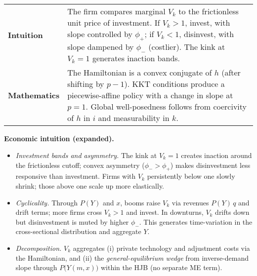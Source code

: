 ﻿\documentclass[11pt,letterpaper,oneside]{article}
\numberwithin{equation}{section}
\newcommand{\1}{\mathbf{1}}
\begin{document}
\begin{tcolorbox}[didacticstyle]
\sloppy
\begin{tabularx}{\textwidth}{@{}p{}X@{}}
\textbf{Intuition} & The firm compares marginal $V_k$ to the frictionless unit price of investment. If $V_k>1$, invest, with slope controlled by $\phi_+$; if $V_k<1$, disinvest, with slope dampened by $\phi_-$ (costlier). The kink at $V_k=1$ generates inaction bands.\\
\textbf{Mathematics} & The Hamiltonian is a convex conjugate of $h$ (after shifting by $p-1$). KKT conditions produce a piecewise-affine policy with a change in slope at $p=1$. Global well-posedness follows from coercivity of $h$ in $i$ and measurability in $k$.
\end{tabularx}
\end{tcolorbox}

\begin{tcolorbox}[didacticstyle]
\textbf{Economic intuition (expanded).}
\begin{itemize}[leftmargin=1.15em,itemsep=0.25em]
  \item \emph{Investment bands and asymmetry.} The kink at $V_k=1$ creates inaction around the frictionless cutoff; convex asymmetry ($\phi_->\phi_+$) makes disinvestment less responsive than investment. Firms with $V_k$ persistently below one slowly shrink; those above one scale up more elastically.
  \item \emph{Cyclicality.} Through $P(Y)$ and $x$, booms raise $V_k$ via revenues $P(Y)\,q$ and drift terms; more firms cross $V_k>1$ and invest. In downturns, $V_k$ drifts down but disinvestment is muted by higher $\phi_-$. This generates time-variation in the cross-sectional distribution and aggregate $Y$.
  \item \emph{Decomposition.} $V_k$ aggregates (i) private technology and adjustment costs via the Hamiltonian, and (ii) the \emph{general-equilibrium wedge} from inverse-demand slope through $P\big(Y(m,x)\big)$ within the HJB (no separate ME term).
\end{itemize}
\end{tcolorbox}
\end{document}
